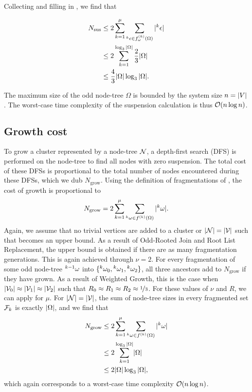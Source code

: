 Collecting  and filling in , we find that

\begin{align*}
  \nonumber N_{\text{sus}} &\leq 2\sum_{k=1}^\mu{ \sum_{  {}^{k} \epsilon \in f_\omega^{(k)}(\Omega) }{ \lvert {}^{k} \epsilon\rvert}  } \\
  \nonumber         &\leq 2\sum_{k=1}^{\log_3{\lvert\Omega\rvert}} \frac{2}{3}\lvert\Omega\rvert\\
                    &\leq \frac{4}{3}\lvert\Omega\rvert\log_3{\lvert\Omega\rvert}.
\end{align*}

The maximum size of the odd node-tree $\Omega$ is bounded by the system size $n = \lvert V\rvert$. The worst-case time complexity of the suspension calculation is thus $\mathcal{O}(n\log{n})$. 

\subsection{Growth cost}\label{sec:growthcost}

To grow a cluster represented by a node-tree $\mathcal{N}$, a depth-first search (DFS) is performed on the node-tree to find all nodes with zero suspension. The total cost of these DFSs is proportional to the total number of nodes encountered during these DFSs, which we dub $N_{\text{grow}}$. Using the definition of fragmentations of , the cost of growth is proportional to
\begin{equation}\label{eq:ngrow}
  N_{\text{grow}} = 2\sum_{k=1}^\mu{ \sum_{ \pr{k}\omega \in f^{(k)}(\Omega) }{ \abs{\pr{k}\omega}} }.
\end{equation}
Again, we assume that no trivial vertices are added to a cluster or $|\mathcal{N}| = |\mathcal{V}|$ such that  becomes an upper bound. As a result of Odd-Rooted Join and Root List Replacement, the upper bound is obtained if there are as many fragmentation generations. This is again achieved through $\nu = 2$. For every fragmentation of some odd node-tree ${}^{k-1}\omega$ into $\{{}^{k}\omega_0, {}^{k}\omega_1, {}^{k}\omega_2\}$, all three ancestors add to $N_{\text{grow}}$ if they have grown. As a result of Weighted Growth, this is the case when $\lvert\mathcal{V}_0\rvert\approx \lvert\mathcal{V}_1\rvert\approx\lvert\mathcal{V}_2\rvert$ such that $R_0 \approx R_1 \approx R_2\approx \nicefrac{1}{3}$. For these values of $\nu$ and $R$, we can apply  for $\mu$. For $|\mathcal{N}| = |\mathcal{V}|$, the sum of node-tree sizes in every fragmented set $\mathcal{F}_k$ is exactly $\lvert\Omega\rvert$, and we find that
\begin{align*}
  \nonumber N_{\text{grow}} &\leq 2\sum_{k=1}^\mu{ \sum_{  {}^{k} \omega \in f^{(k)}(\Omega) }{ \lvert {}^{k} \omega\rvert}  } \\
  \nonumber         &\leq 2\sum_{k=1}^{\log_3{\lvert\Omega\rvert}} \lvert\Omega\rvert\\
                    &\leq 2\lvert\Omega\rvert\log_3{\lvert\Omega\rvert},
\end{align*}
which again corresponds to a worst-case time complexity $\mathcal{O}(n\log{n})$.